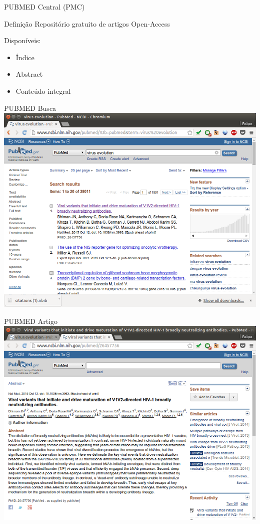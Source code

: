 \documentclass{beamer}
\begin{document}
\begin{frame}{PUBMED Central (PMC)}
  \begin{block}{Definição}
    Repositório gratuito de artigos Open-Access
  \end{block}
  Disponíveis:
  \begin{itemize}
    \footnotesize
  \item Índice
  \item Abstract
  \item Conteúdo integral
  \end{itemize}
\end{frame}

\begin{frame}{PUBMED Busca}
  \centering
  \includegraphics[height=.85\textheight]{Busca/pubmed-busca}
\end{frame}

\begin{frame}{PUBMED Artigo}
  \centering
  \includegraphics[height=.85\textheight]{Busca/pubmed-paper}
\end{frame}
\end{document}
